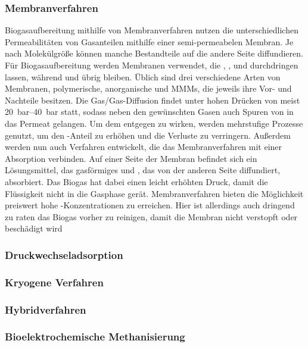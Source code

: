 \subsubsection{Membranverfahren}\label{chap:membrane} 

Biogasaufbereitung mithilfe von Membranverfahren nutzen die unterschiedlichen Permeabilitäten von Gasanteilen mithilfe einer semi-permeabelen Membran. Je nach Molekülgröße können manche Bestandteile auf die andere Seite diffundieren. Für Biogasaufbereitung werden Membranen verwendet, die , ,  und  durchdringen lassen, während  und  übrig bleiben. Üblich sind drei verschiedene Arten von Membranen, polymerische, anorganische und \glspl{MMM}, die jeweils ihre Vor- und Nachteile besitzen. Die Gas/Gas-Diffusion findet unter hohen Drücken von meist \SIrange{20}{40}{\bar} statt, sodass neben den gewünschten Gasen auch Spuren von  in das Permeat gelangen. Um dem entgegen zu wirken, werden mehrstufige Prozesse genutzt, um den -Anteil zu erhöhen und die Verluste zu verringern. Außerdem werden nun auch Verfahren entwickelt, die das Membranverfahren mit einer Absorption verbinden. Auf einer Seite der Membran befindet sich ein Lösungsmittel, das gasförmiges  und , das von der anderen Seite diffundiert, absorbiert. Das Biogas hat dabei einen leicht erhöhten Druck, damit die Flüssigkeit nicht in die Gasphase gerät. Membranverfahren bieten die Möglichkeit preiswert hohe -Konzentrationen zu erreichen. Hier ist allerdings auch dringend zu raten das Biogas vorher zu reinigen, damit die Membran nicht verstopft oder beschädigt wird     \parencite{KGKK2019}


\subsubsection{Druckwechseladsorption}\label{chap:PSA}


\subsubsection{Kryogene Verfahren}\label{chap:kryo}



\subsubsection{Hybridverfahren}\label{chap:hybrid} 


\subsubsection{Bioelektrochemische Methanisierung}\label{chap:bioelectr}


